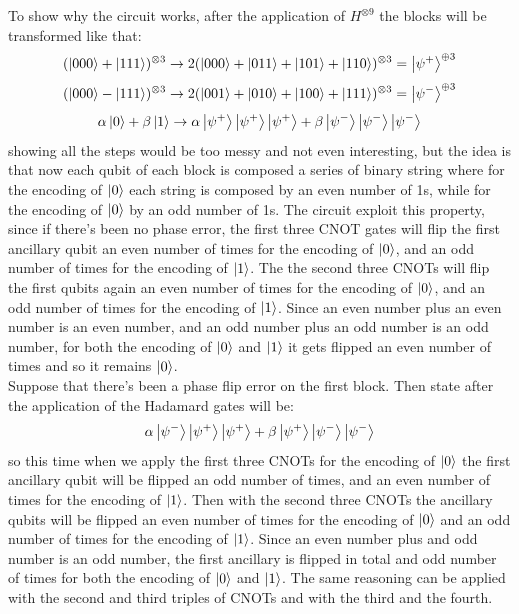 \documentclass{article}
\begin{document}
	To show why the circuit works, after the application of $H^{\otimes 9}$ the blocks will be transformed like that:
	\[  (\ket{000} + \ket{111})^{\otimes 3} \rightarrow 2(\ket{000} + \ket{011} + \ket{101} + \ket{110})^{\otimes 3} = \ket{\psi^+}^{\oplus 3}\]
	\[  (\ket{000} - \ket{111})^{\otimes 3} \rightarrow 2(\ket{001} + \ket{010} + \ket{100} + \ket{111})^{\otimes 3} = \ket{\psi^-}^{\oplus 3}\]
	\[\alpha \ket{0} + \beta\ket{1} \rightarrow \alpha\ket{\psi^+}\ket{\psi^+}\ket{\psi^+} + \beta\ket{\psi^-}\ket{\psi^-}\ket{\psi^-}\]
	showing all the steps would be too messy and not even interesting, but the idea is that now each qubit of each block is composed a series of binary string where for the encoding of $\ket{0}$ each string is composed by an even number of 1s, while for the encoding of $\ket{0}$ by an odd number of 1s. The circuit exploit this property, since if there's been no phase error, the first three CNOT gates will flip the first ancillary qubit an even number of times for the encoding of $\ket{0}$, and an odd number of times for the encoding of $\ket{1}$. The the second three CNOTs will flip the first qubits again an even number of times for the encoding of $\ket{0}$, and an odd number of times for the encoding of $\ket{1}$. Since an even number plus an even number is an even number, and an odd number plus an odd number is an odd number, for both the encoding of $\ket{0}$ and $\ket{1}$ it gets flipped an even number of times and so it remains $\ket{0}$.\\
	Suppose that there's been a phase flip error on the first block. Then state after the application of the Hadamard gates will be:
	\[ \alpha\ket{\psi^-}\ket{\psi^+}\ket{\psi^+} + \beta\ket{\psi^+}\ket{\psi^-}\ket{\psi^-}\]
	so this time when we apply the first three CNOTs for the encoding of $\ket{0}$ the first ancillary qubit will be flipped an odd number of times, and an even number of times for the encoding of $\ket{1}$. Then with the second three CNOTs the ancillary qubits will be flipped an even number of times for the encoding of $\ket{0}$ and an odd number of times for the encoding of $\ket{1}$. Since an even number plus and odd number is an odd number, the first ancillary is flipped in total and odd number of times for both the encoding of $\ket{0}$ and $\ket{1}$. The same reasoning can be applied with the second and third triples of CNOTs and with the third and the fourth.
	
\end{document}
